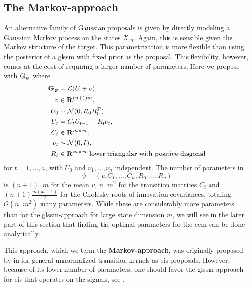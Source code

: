 \subsection{The Markov-approach}
\label{subsec:markov-approach}
An alternative family of Gaussian proposals is given by directly modeling a Gaussian Markov process on the states $X_{:n}$. Again, this is sensible given the Markov structure of the target. This parametrization is more flexible than using the posterior of a \gls{glssm} with fixed prior as the proposal. This flexibility, however, comes at the cost of requiring a larger number of parameters. Here we propose with $\mathbf G_{\psi}$ where
\begin{align}
    \begin{split}
    \label{eq:markov-proposal}
    \mathbf G_{\psi} &= \mathcal L (U + v), \\
    v &\in \mathbf R^{(n + 1)m}, \\
    U_{0} &\sim \mathcal N(0, R_{0}R_{0}^T),\\
    U_{t} &= C_{t}U_{t - 1} + R_{t}\nu_{t}, \\
    C_{t} &\in \mathbf R^{m\times m},\\
    \nu_{t} &\sim \mathcal N(0,I), \\
    R_{t}&\in\mathbf R^{m \times m} \text{ lower triangular with positive diagonal}
    \end{split}
\end{align}
for $t = 1, \dots, n$, with $U_{0}$ and $\nu_{1}, \dots, \nu_{n}$ independent. The number of parameters in $$\psi= \left( v, C_{1}, \dots, C_{n}, R_{0}, \dots, R_{n} \right)$$ is $(n + 1)\cdot m$ for the mean $v$, $n \cdot m^{2}$ for the transition matrices $C_{t}$ and $(n + 1) \frac{m (m - 1)}{2}$ for the Cholesky roots of innovation covariances, totaling $\mathcal O(n\cdot m^{2})$ many parameters. 
While these are considerably more parameters than for the \gls{glssm}-approach for large state dimension $m$, we will see in the later part of this section that finding the optimal parameters for the \gls{cem} can be done analytically. 

This approach, which we term the \textbf{Markov-approach}, was originally proposed by \citeauthor{Richard2007Efficient} in \cite{Richard2007Efficient} for general unnormalized transition kernels as \gls{eis} proposals. However, because of its lower number of parameters, one should favor the \gls{glssm}-approach for \gls{eis} that operates on the signals, see \cite{Koopman2019Modified}.

